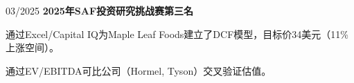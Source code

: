 \begin{twocolentry}{03/2025}
    \textbf{2025年SAF投资研究挑战赛第三名}
\end{twocolentry}
\begin{onecolentry}
\begin{highlights}
\item 通过Excel/Capital IQ为Maple Leaf Foods建立了DCF模型，目标价34美元（11\%上涨空间）。
\item 通过EV/EBITDA可比公司（Hormel, Tyson）交叉验证估值。
\end{highlights}
\end{onecolentry}
